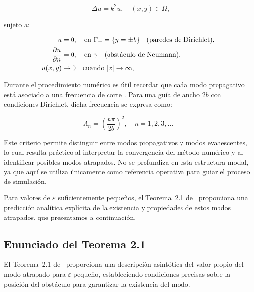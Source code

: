 \documentclass[11pt]{article}
\begin{document}
\begin{equation}
-\Delta u = k^2 u, \quad (x, y) \in \Omega,
\end{equation}

sujeto a:

\begin{align}
u &= 0, \quad \text{en } \Gamma_\pm = \{y = \pm b\} \quad (\text{paredes de Dirichlet}), \\
\pdv{u}{n} &= 0, \quad \text{en } \gamma \quad (\text{obstáculo de Neumann}), \\
u(x,y) &\to 0 \quad \text{cuando } |x| \to \infty,
\end{align}

Durante el procedimiento numérico es útil recordar que cada modo propagativo está asociado a una frecuencia de corte \cite{sargent2013trapped}. Para una guía de ancho $2b$ con condiciones Dirichlet, dicha frecuencia se expresa como:

\begin{equation}
\Lambda_n = \left( \frac{n \pi}{2b} \right)^2, \quad n = 1, 2, 3, \ldots
\end{equation}

Este criterio permite distinguir entre modos propagativos y modos evanescentes, lo cual resulta práctico al interpretar la convergencia del método numérico y al identificar posibles modos atrapados. No se profundiza en esta estructura modal, ya que aquí se utiliza únicamente como referencia operativa para guiar el proceso de simulación.

Para valores de $\varepsilon$ suficientemente pequeños, el Teorema~2.1 de~\cite{Zhevandrov2025} proporciona una predicción analítica explícita de la existencia y propiedades de estos modos atrapados, que presentamos a continuación.

\subsection{Enunciado del Teorema 2.1}\label{subsec:teorema_2_1}

El Teorema~2.1 de~\cite{Zhevandrov2025} proporciona una descripción asintótica del valor propio del modo atrapado para \(\varepsilon\) pequeño, estableciendo condiciones precisas sobre la posición del obstáculo para garantizar la existencia del modo.
\end{document}
